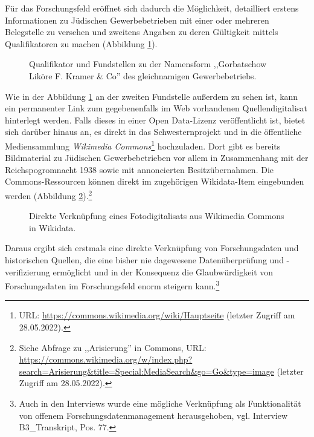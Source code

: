 Für das Forschungsfeld eröffnet sich dadurch die Möglichkeit, detailliert erstens Informationen zu Jüdischen Gewerbebetrieben mit einer oder mehreren Belegstelle zu versehen und zweitens Angaben zu deren Gültigkeit mittels Qualifikatoren zu machen (Abbildung \ref{fig:wikidatareference}).

\begin{figure}[h]
    \centering
    \caption[Qualifikatoren und Fundstellen in Wikidata]{Qualifikator und Fundstellen zu der Namensform ,,Gorbatschow Liköre F. Kramer \& Co'' des gleichnamigen Gewerbebetriebs.}
    \label{fig:wikidatareference}
\end{figure}

Wie in der Abbildung \ref{fig:wikidatareference} an der zweiten Fundstelle außerdem zu sehen ist, kann ein permanenter Link zum gegebenenfalls im Web vorhandenen Quellendigitalisat hinterlegt werden. Falls dieses in einer Open Data-Lizenz veröffentlicht ist, bietet sich darüber hinaus an, es direkt in das Schwesternprojekt und in die öffentliche Mediensammlung \textit{Wikimedia Commons}\footnote{URL: \url{https://commons.wikimedia.org/wiki/Hauptseite} (letzter Zugriff am 28.05.2022).} hochzuladen. Dort gibt es bereits Bildmaterial zu Jüdischen Gewerbebetrieben vor allem in Zusammenhang mit der Reichspogromnacht 1938 sowie mit annoncierten Besitzübernahmen. Die Commons-Ressourcen können direkt im zugehörigen Wikidata-Item eingebunden werden (Abbildung \ref{fig:wikidatacommons}).\footnote{Siehe Abfrage zu ,,Arisierung'' in Commons, URL: \url{https://commons.wikimedia.org/w/index.php?search=Arisierung&title=Special:MediaSearch&go=Go&type=image} (letzter Zugriff am 28.05.2022).}

\begin{figure}[h]
    \centering
    \caption[Verknüpfungen in Wikidata]{Direkte Verknüpfung eines Fotodigitalisats aus Wikimedia Commons in Wikidata.}
    \label{fig:wikidatacommons}
\end{figure}

Daraus ergibt sich erstmals eine direkte Verknüpfung von Forschungsdaten und historischen Quellen, die eine bisher nie dagewesene Datenüberprüfung und -verifizierung ermöglicht und in der Konsequenz die Glaubwürdigkeit von Forschungsdaten im Forschungsfeld enorm steigern kann.\footnote{Auch in den Interviews wurde eine mögliche Verknüpfung als Funktionalität von offenem Forschungsdatenmanagement herausgehoben, vgl. Interview B3\_Transkript, Pos. 77.} 

